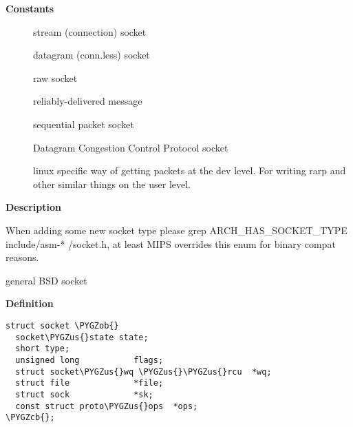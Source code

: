 \documentclass[a4paper,8pt,english]{sphinxmanual}
\def\PYGZus{\char`\_}
\def\PYGZob{\char`\{}
\def\PYGZcb{\char`\}}
\begin{document}
\textbf{Constants}
\begin{description}
\item[{}] \leavevmode
stream (connection) socket

\item[{}] \leavevmode
datagram (conn.less) socket

\item[{}] \leavevmode
raw socket

\item[{}] \leavevmode
reliably-delivered message

\item[{}] \leavevmode
sequential packet socket

\item[{}] \leavevmode
Datagram Congestion Control Protocol socket

\item[{}] \leavevmode
linux specific way of getting packets at the dev level.
For writing rarp and other similar things on the user level.

\end{description}

\textbf{Description}

When adding some new socket type please
grep ARCH\_HAS\_SOCKET\_TYPE include/asm-* /socket.h, at least MIPS
overrides this enum for binary compat reasons.

\begin{fulllineitems}
\label{networking/kapi:c.socket}
general BSD socket

\end{fulllineitems}


\textbf{Definition}

\begin{Verbatim}[commandchars=\\\{\}]
struct socket \PYGZob{}
  socket\PYGZus{}state state;
  short type;
  unsigned long           flags;
  struct socket\PYGZus{}wq \PYGZus{}\PYGZus{}rcu  *wq;
  struct file             *file;
  struct sock             *sk;
  const struct proto\PYGZus{}ops  *ops;
\PYGZcb{};
\end{Verbatim}
\end{document}
